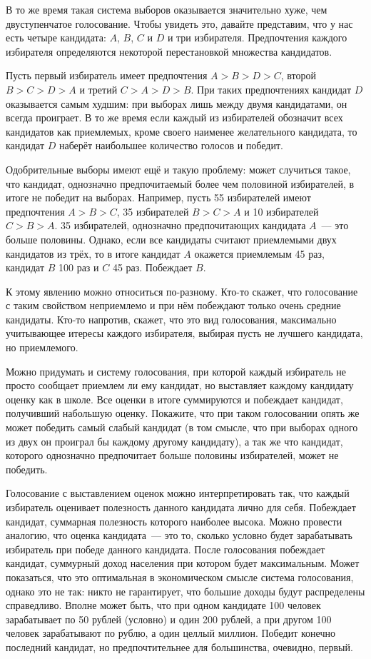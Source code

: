 В то же время такая система выборов оказывается значительно хуже, чем двуступенчатое голосование. Чтобы увидеть это, давайте представим, что у нас есть четыре кандидата: $A$, $B$, $C$ и $D$ и три избирателя. Предпочтения каждого избирателя определяются некоторой перестановкой множества кандидатов.

Пусть первый избиратель имеет предпочтения $A>B>D>C$, второй $B>C>D>A$ и третий $C>A>D>B$. При таких предпочтениях кандидат $D$ оказывается самым худшим: при выборах лишь между двумя кандидатами, он всегда проиграет. В то же время если каждый из избирателей обозначит всех кандидатов как приемлемых, кроме своего наименее желательного кандидата, то кандидат $D$ наберёт наибольшее количество голосов и победит.

Одобрительные выборы имеют ещё и такую проблему: может случиться такое, что кандидат, однозначно предпочитаемый более чем половиной избирателей, в итоге не победит на выборах. Например, пусть 55 избирателей имеют предпочтения $A>B>C$, 35 избирателей $B>C>A$ и 10 избирателей $C>B>A$. 35 избирателей, однозначно предпочитающих кандидата $A$~— это больше половины. Однако, если все кандидаты считают приемлемыми двух кандидатов из трёх, то в итоге кандидат $A$ окажется приемлемым 45 раз, кандидат $B$ 100 раз и $C$ 45 раз. Побеждает $B$.

К этому явлению можно относиться по-разному. Кто-то скажет, что голосование с таким свойством неприемлемо и при нём побеждают только очень средние кандидаты. Кто-то напротив, скажет, что это вид голосования, максимально учитывающее итересы каждого избирателя, выбирая пусть не лучшего кандидата, но приемлемого.

\begin{exercise}
Можно придумать и систему голосования, при которой каждый избиратель не просто сообщает приемлем ли ему кандидат, но выставляет каждому кандидату оценку как в школе. Все оценки в итоге суммируются и побеждает кандидат, получивший набольшую оценку. Покажите, что при таком голосовании опять же может победить самый слабый кандидат (в том смысле, что при выборах одного из двух он проиграл бы каждому другому кандидату), а так же что кандидат, которого однозначно предпочитает больше половины избирателей, может не победить.
\end{exercise}

Голосование с выставлением оценок можно интерпретировать так, что каждый избиратель оценивает полезность данного кандидата лично для себя. Побеждает кандидат, суммарная полезность которого наиболее высока. Можно провести аналогию, что оценка кандидата~— это то, сколько условно будет зарабатывать избиратель при победе данного кандидата. После голосования побеждает кандидат, суммурный доход населения при котором будет максимальным. Может показаться, что это оптимальная в экономическом смысле система голосования, однако это не так: никто не гарантирует, что большие доходы будут распределены справедливо. Вполне может быть, что при одном кандидате 100 человек зарабатывает по 50 рублей (условно) и один 200 рублей, а при другом 100 человек зарабатывают по рублю, а один целлый миллион. Победит конечно последний кандидат, но предпочтительнее для большинства, очевидно, первый.

